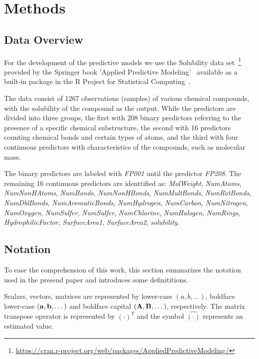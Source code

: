 \section{Methods}

\subsection{Data Overview}
For the development of the predictive models we use the Solubility data set~\footnote{\url{https://cran.r-project.org/web/packages/AppliedPredictiveModeling/}} provided by the Springer book 'Applied Predictive Modeling'~\cite{Kuhn2013} available as a built-in package in the R Project for Statistical Computing~\cite{Rproject2022}. 

The data consist of 1267 observations (samples) of various chemical compounds, with the solubility of the compound as the output. While the predictors are divided into three groups, the first with 208 binary predictors referring to the presence of a specific chemical substructure, the second with 16 predictors counting chemical bonds and certain types of atoms, and the third with four continuous predictors with characteristics of the compounds, such as molecular mass. 

The binary predictors are labeled with \textit{FP001} until the predictor \textit{FP208}. The remaining 16 continuous predictors are identtified as: \textit{MolWeight}, \textit{NumAtoms}, \textit{NumNonHAtoms}, \textit{NumBonds}, \textit{NumNonHBonds}, \textit{NumMultBonds}, \textit{NumRotBonds}, \textit{NumDblBonds}, \textit{NumAromaticBonds}, \textit{NumHydrogen}, \textit{NumCarbon}, \textit{NumNitrogen}, \textit{NumOxygen}, \textit{NumSulfer}, \textit{NumSulfer}, \textit{NumChlorine}, \textit{NumHalogen}, \textit{NumRings}, \textit{HydrophilicFactor}, \textit{SurfaceArea1}, \textit{SurfaceArea2}, \textit{solubility}.

\subsection{Notation}
To ease the comprehension of this work, this section summarizes the notation used in the presend paper and introduces some definititions.

Scalars, vectors, matrices are represented by lower-case $(a, b, \dots)$, boldface lower-case $({\bf a}, {\bf b}, \dots)$ and boldface capital $({\bf A}, {\bf B}, \dots)$, respectively. The matrix transpose operator is represented by $(\cdot)^T$ and the symbol $\hat{(\cdot)}$ represents an estimated value.

